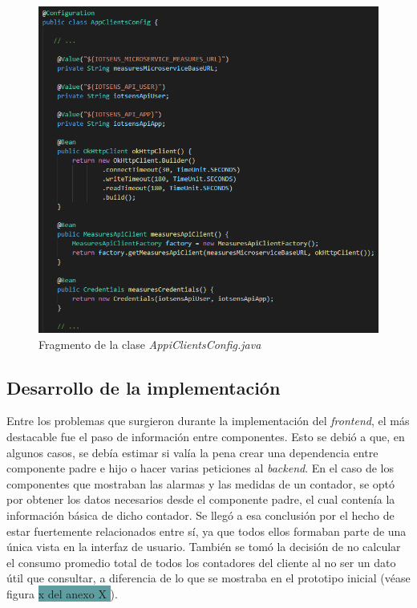 \documentclass[pdftex,11pt,a4paper]{book}
\begin{document}
 \begin{figure}[H]
 \centering
 \includegraphics [scale=0.65] {images/implementacion/watermeter-config.png}
 \caption{Fragmento de la clase \textit{AppiClientsConfig.java}} \label{fig:watermeter-config}
 \end{figure}
 
 \subsection{Desarrollo de la implementación}
 
 Entre los problemas que surgieron durante la implementación del \textit{frontend}, el más destacable fue el paso de información entre componentes. Esto se debió a que, en algunos casos, se debía estimar si valía la pena crear una dependencia entre componente padre e hijo o hacer varias peticiones al \textit{backend}. En el caso de los componentes que mostraban las alarmas y las medidas de un contador, se optó por obtener los datos necesarios desde el componente padre, el cual contenía la información básica de dicho contador. Se llegó a esa conclusión por el hecho de estar fuertemente relacionados entre sí, ya que todos ellos formaban parte de una única vista en la interfaz de usuario.
También se tomó la decisión de no calcular el consumo promedio total de todos los contadores del cliente al no ser un dato útil que consultar, a diferencia de lo que se mostraba en el prototipo inicial (véase figura \colorbox{CadetBlue}{ x del anexo X }).
\end{document}
